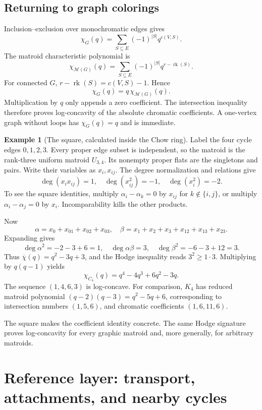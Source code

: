 \documentclass[11pt]{article}
\theoremstyle{definition}
\newtheorem{example}[theorem]{Example}
\theoremstyle{remark}
\begin{document}
\subsection{Returning to graph colorings}

Inclusion--exclusion over monochromatic edges gives
\[
 \chi_G(q)=\sum_{S\subseteq E}(-1)^{|S|}q^{c(V,S)}.
\]
The matroid characteristic polynomial is
\[
 \chi_{\mathcal M(G)}(q)=
 \sum_{S\subseteq E}(-1)^{|S|}q^{r-\operatorname{rk}(S)}.
\]
For connected $G$, $r-\operatorname{rk}(S)=c(V,S)-1$. Hence
\[
 \chi_G(q)=q\,\chi_{\mathcal M(G)}(q).
\]
Multiplication by $q$ only appends a zero coefficient. The intersection inequality therefore proves log-concavity of the absolute chromatic coefficients. A one-vertex graph without loops has $\chi_G(q)=q$ and is immediate.

\begin{example}[The square, calculated inside the Chow ring]\label{ex:gmh-c4}
Label the four cycle edges $0,1,2,3$. Every proper edge subset is independent, so the matroid is the rank-three uniform matroid $U_{3,4}$. Its nonempty proper flats are the singletons and pairs. Write their variables as $x_i,x_{ij}$. The degree normalization and relations give
\[
 \deg(x_ix_{ij})=1,
 \quad\deg(x_{ij}^2)=-1,
 \quad\deg(x_i^2)=-2.
\]
To see the square identities, multiply $\alpha_i-\alpha_k=0$ by $x_{ij}$ for $k\notin\{i,j\}$, or multiply $\alpha_i-\alpha_j=0$ by $x_i$. Incomparability kills the other products.

Now
\[
 \alpha=x_0+x_{01}+x_{02}+x_{03},
 \quad
 \beta=x_1+x_2+x_3+x_{12}+x_{13}+x_{23}.
\]
Expanding gives
\[
 \deg\alpha^2=-2-3+6=1,
 \quad\deg\alpha\beta=3,
 \quad\deg\beta^2=-6-3+12=3.
\]
Thus $\overline\chi(q)=q^2-3q+3$, and the Hodge inequality reads $3^2\ge1\cdot3$. Multiplying by $q(q-1)$ yields
\[
 \chi_{C_4}(q)=q^4-4q^3+6q^2-3q.
\]
The sequence $(1,4,6,3)$ is log-concave. For comparison, $K_4$ has reduced matroid polynomial $(q-2)(q-3)=q^2-5q+6$, corresponding to intersection numbers $(1,5,6)$, and chromatic coefficients $(1,6,11,6)$.
\end{example}

The square makes the coefficient identity concrete. The same Hodge signature proves log-concavity for every graphic matroid and, more generally, for arbitrary matroids.

\section{Reference layer: transport, attachments, and nearby cycles}
\label{sec:background-attachments}
\end{document}
